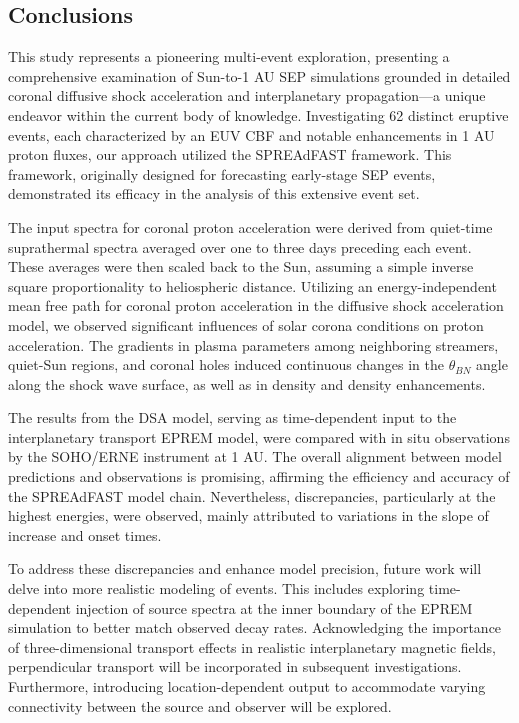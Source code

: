 \subsection{Conclusions}
This study represents a pioneering multi-event exploration, presenting a comprehensive examination of Sun-to-1 AU SEP simulations grounded in detailed coronal diffusive shock acceleration and interplanetary propagation—a unique endeavor within the current body of knowledge. Investigating 62 distinct eruptive events, each characterized by an EUV CBF and notable enhancements in 1 AU proton fluxes, our approach utilized the SPREAdFAST framework. This framework, originally designed for forecasting early-stage SEP events, demonstrated its efficacy in the analysis of this extensive event set.

The input spectra for coronal proton acceleration were derived from quiet-time suprathermal spectra averaged over one to three days preceding each event. These averages were then scaled back to the Sun, assuming a simple inverse square proportionality to heliospheric distance. Utilizing an energy-independent mean free path for coronal proton acceleration in the diffusive shock acceleration model, we observed significant influences of solar corona conditions on proton acceleration. The gradients in plasma parameters among neighboring streamers, quiet-Sun regions, and coronal holes induced continuous changes in the $\theta_{BN}$ angle along the shock wave surface, as well as in density and density enhancements.

The results from the DSA model, serving as time-dependent input to the interplanetary transport EPREM model, were compared with in situ observations by the SOHO/ERNE instrument at 1 AU. The overall alignment between model predictions and observations is promising, affirming the efficiency and accuracy of the SPREAdFAST model chain. Nevertheless, discrepancies, particularly at the highest energies, were observed, mainly attributed to variations in the slope of increase and onset times.

To address these discrepancies and enhance model precision, future work will delve into more realistic modeling of events. This includes exploring time-dependent injection of source spectra at the inner boundary of the EPREM simulation to better match observed decay rates. Acknowledging the importance of three-dimensional transport effects in realistic interplanetary magnetic fields, perpendicular transport will be incorporated in subsequent investigations. Furthermore, introducing location-dependent output to accommodate varying connectivity between the source and observer will be explored.

